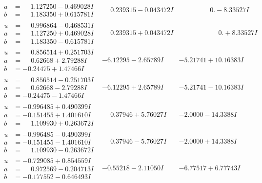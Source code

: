 \documentclass[1p]{elsarticle_modified}
\theoremstyle{definition}
\begin{document}
$$\begin{array}{c|c|c}
\begin{aligned}
a &= \phantom{-}1.127250 - 0.469028 I \\
b &= \phantom{-}1.183350 + 0.615781 I\end{aligned}
 & \phantom{-}0.239315 - 0.043472 I & \phantom{-0.000000 } 0. - 8.33527 I \\ \hline\begin{aligned}
u &= \phantom{-}0.996864 - 0.468531 I \\
a &= \phantom{-}1.127250 + 0.469028 I \\
b &= \phantom{-}1.183350 - 0.615781 I\end{aligned}
 & \phantom{-}0.239315 + 0.043472 I & \phantom{-0.000000 -}0. + 8.33527 I \\ \hline\begin{aligned}
u &= \phantom{-}0.856514 + 0.251703 I \\
a &= \phantom{-}0.62668 + 2.79288 I \\
b &= -0.24475 + 1.47466 I\end{aligned}
 & -6.12295 - 2.65789 I & -5.21741 + 10.16383 I \\ \hline\begin{aligned}
u &= \phantom{-}0.856514 - 0.251703 I \\
a &= \phantom{-}0.62668 - 2.79288 I \\
b &= -0.24475 - 1.47466 I\end{aligned}
 & -6.12295 + 2.65789 I & -5.21741 - 10.16383 I \\ \hline\begin{aligned}
u &= -0.996485 + 0.490399 I \\
a &= -0.151455 + 1.401610 I \\
b &= \phantom{-}1.109930 + 0.263672 I\end{aligned}
 & \phantom{-}0.37946 + 5.76027 I & -2.0000 - 14.3388 I \\ \hline\begin{aligned}
u &= -0.996485 - 0.490399 I \\
a &= -0.151455 - 1.401610 I \\
b &= \phantom{-}1.109930 - 0.263672 I\end{aligned}
 & \phantom{-}0.37946 - 5.76027 I & -2.0000 + 14.3388 I \\ \hline\begin{aligned}
u &= -0.729085 + 0.854559 I \\
a &= \phantom{-}0.972569 - 0.204713 I \\
b &= -0.177552 - 0.646493 I\end{aligned}
 & -0.55218 - 2.11050 I & -6.77517 + 6.77743 I \\ \hline\begin{aligned}

\end{aligned}
\end{array}$$
\end{document}
